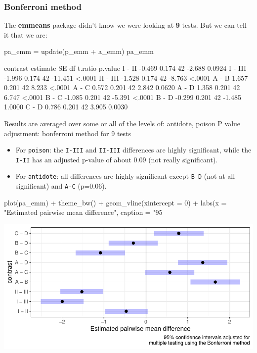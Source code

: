 \documentclass[a4paper]{article}
\begin{document}
\subsubsection{Bonferroni method}
The \textbf{emmeans} package didn't know we were looking at \textbf{9} tests. But we can tell it that we are:
\begin{Schunk}
\begin{Sinput}
pa_emm = update(p_emm + a_emm)
pa_emm
\end{Sinput}
\begin{Soutput}
 contrast estimate    SE df t.ratio p.value
 I - II     -0.469 0.174 42  -2.688  0.0924
 I - III    -1.996 0.174 42 -11.451  <.0001
 II - III   -1.528 0.174 42  -8.763  <.0001
 A - B       1.657 0.201 42   8.233  <.0001
 A - C       0.572 0.201 42   2.842  0.0620
 A - D       1.358 0.201 42   6.747  <.0001
 B - C      -1.085 0.201 42  -5.391  <.0001
 B - D      -0.299 0.201 42  -1.485  1.0000
 C - D       0.786 0.201 42   3.905  0.0030

Results are averaged over some or all of the levels of: antidote, poison 
P value adjustment: bonferroni method for 9 tests 
\end{Soutput}
\end{Schunk}
\begin{itemize}
	\item For \lstinline|poison|: the \lstinline|I-III| and \lstinline|II-III| differences are highly significant, while the \lstinline|I-II| has an adjusted p-value of about 0.09 (not really significant).
	\item For \lstinline|antidote|: all differences are highly significant except \lstinline|B-D| (not at all significant) and \lstinline|A-C| (p=0.06).
\end{itemize}
\begin{Schunk}
\begin{Sinput}
plot(pa_emm) + theme_bw() + geom_vline(xintercept = 0) + 
  labs(x = "Estimated pairwise mean difference", 
       caption = "95%
\end{Sinput}


{\centering \includegraphics[width=\maxwidth]{figure/listings-unnamed-chunk-331-1} 

}

\end{Schunk}
\end{document}
